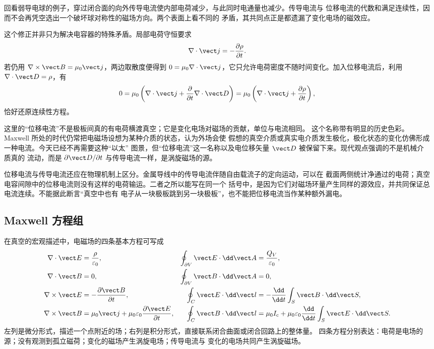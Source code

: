 回看弱导电球的例子，穿过闭合面的向外传导电流使内部电荷减少，与此同时电通量也减少。传导电流与
位移电流的代数和满足连续性，因而不会再凭空选出一个破坏球对称性的磁场方向。两个表面上看不同的
矛盾，其共同点正是都遗漏了变化电场的磁效应。

这个修正并非只为解决电容器的特殊矛盾。局部电荷守恒要求
\begin{equation}
  \nabla\cdot\vect j=-\frac{\partial\rho}{\partial t}.
\end{equation}
若仍用 $\nabla\times\vect B=\mu_0\vect j$，两边取散度便得到
$0=\mu_0\nabla\cdot\vect j$，它只允许电荷密度不随时间变化。加入位移电流后，利用
$\nabla\cdot\vect D=\rho$，有
\begin{equation}
  0=\mu_0\left(\nabla\cdot\vect j+
  \frac{\partial}{\partial t}\nabla\cdot\vect D\right)
  =\mu_0\left(\nabla\cdot\vect j+\frac{\partial\rho}{\partial t}\right),
\end{equation}
恰好还原连续性方程。

\continuityDiagram

这里的“位移电流”不是极板间真的有电荷横渡真空；它是变化电场对磁场的贡献，单位与电流相同。
这个名称带有明显的历史色彩。Maxwell 所处的时代仍常把电磁场设想为某种介质的状态，认为外场会使
假想的真空介质或真实电介质发生极化，极化状态的变化仿佛形成一种电流。今天已经不再需要这种“以太”
图景，但“位移电流”这一名称以及电位移矢量 $\vect D$ 被保留下来。现代观点强调的不是机械介质真的
流动，而是 $\partial\vect D/\partial t$ 与传导电流一样，是涡旋磁场的源。

位移电流与传导电流还应在物理机制上区分。金属导线中的传导电流伴随自由载流子的定向运动，可以在
截面两侧统计净通过的电荷；真空电容间隙中的位移电流则没有这样的电荷输运。二者之所以能写在同一个
括号中，是因为它们对磁场环量产生同样的源效应，并共同保证总电流连续。不能据此断言“真空中也有
电子从一块极板跳到另一块极板”，也不能把位移电流当作某种额外漏电。

\subsection*{Maxwell 方程组}

在真空的宏观描述中，电磁场的四条基本方程可写成
\begin{align}
  \nabla\cdot\vect E&=\frac{\rho}{\varepsilon_0},
  &\oint_{\partial V}\vect E\cdot\dd\vect A&=\frac{Q_V}{\varepsilon_0},
  \\
  \nabla\cdot\vect B&=0,
  &\oint_{\partial V}\vect B\cdot\dd\vect A&=0,
  \\
  \nabla\times\vect E&=-\frac{\partial\vect B}{\partial t},
  &\oint_C\vect E\cdot\dd\vect l&=-\frac{\dd}{\dd t}\int_S\vect B\cdot\dd\vect S,
  \\
  \nabla\times\vect B&=\mu_0\vect j+\mu_0\varepsilon_0
  \frac{\partial\vect E}{\partial t},
  &\oint_C\vect B\cdot\dd\vect l&=\mu_0 I_{\rm c}+\mu_0\varepsilon_0
  \frac{\dd}{\dd t}\int_S\vect E\cdot\dd\vect S.
\end{align}
左列是微分形式，描述一个点附近的场；右列是积分形式，直接联系闭合曲面或闭合回路上的整体量。
四条方程分别表达：电荷是电场的源；没有观测到孤立磁荷；变化的磁场产生涡旋电场；传导电流与
变化的电场共同产生涡旋磁场。

